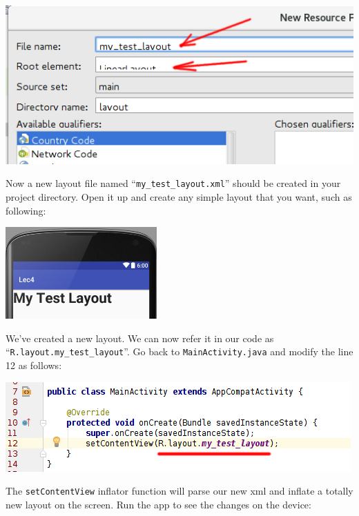 \begin{center}
	\includegraphics[scale=0.4]{chapters/ch04/images/40}
\end{center}

Now a new layout file named ``\texttt{my\_test\_layout.xml}'' should be created in your project directory. Open it up and create any simple layout that you want, such as following:

\begin{center}
	\includegraphics[scale=0.4]{chapters/ch04/images/41}
\end{center}

We've created a new layout. We can now refer it in our code as ``\texttt{R.layout.my\_test\_layout}''. Go back to \texttt{MainActivity.java} and modify the line 12 as follows:

\begin{center}
	\includegraphics[scale=0.4]{chapters/ch04/images/42}
\end{center}

The \texttt{setContentView} inflator function will parse our new xml and inflate a totally new layout on the screen. Run the app to see the changes on the device:

